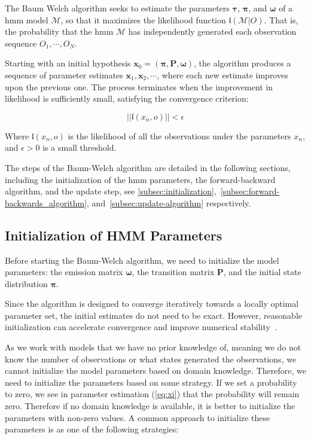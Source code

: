 The Baum Welch algorithm seeks to estimate the parameters $\pmb{\tau}$, $\pmb{\pi}$, and $\pmb{\omega}$ of a \gls{hmm} model $\mathcal{M}$, so that it maximizes the likelihood function $\mathfrak{l}(\mathcal{M} | O)$.
That is, the probability that the \gls{hmm} $\mathcal{M}$ has independently generated each observation sequence $O_1, \cdots, O_N$.

Starting with an initial hypothesis $\textbf{x}_0 = (\pmb{\pi}, \pmb{P}, \pmb{\omega})$, the algorithm produces a sequence of parameter estimates $\textbf{x}_1, \textbf{x}_2, \cdots$, where each new estimate improves upon the previous one.
The process terminates when the improvement in likelihood is sufficiently small, satisfying the convergence criterion:

\[
    ||\mathfrak{l}(x_n, o)|| < \epsilon
\]

Where $\mathfrak{l}(x_n, o)$ is the likelihood of all the observations under the parameters $x_n$, and $\epsilon > 0$ is a small threshold.

The steps of the Baum-Welch algorithm are detailed in the following sections, including the initialization of the \gls{hmm} parameters, the forward-backward algorithm, and the update step, see \autoref{subsec:initialization},~\ref{subsec:forward-backwards_algorithm}, and~\ref{subsec:update-algorithm} respectively.

\subsection{Initialization of HMM Parameters}\label{subsec:initialization}
Before starting the Baum-Welch algorithm, we need to initialize the model parameters: the emission matrix $\pmb{\omega}$, the transition matrix $\pmb{P}$, and the initial state distribution $\pmb{\pi}$.

Since the algorithm is designed to converge iteratively towards a locally optimal parameter set, the initial estimates do not need to be exact.
However, reasonable initialization can accelerate convergence and improve numerical stability~\cite{benyacoub2015initial}.

As we work with models that we have no prior knowledge of, meaning we do not know the number of observations or what states generated the observations, we cannot initialize the model parameters based on domain knowledge.
Therefore, we need to initialize the parameters based on some strategy.
If we set a probability to zero, we see in parameter estimation (\autoref{eq:xi}) that the probability will remain zero. 
Therefore if no domain knowledge is available, it is better to initialize the parameters with non-zero values.
A common approach to initialize these parameters is as one of the following strategies:

